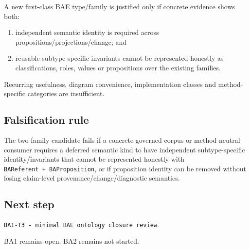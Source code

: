 \documentclass[
  10pt,
]{article}
\providecommand{\tightlist}{%
  \setlength{\itemsep}{0pt}\setlength{\parskip}{0pt}}
\begin{document}
A new first-class BAE type/family is justified only if concrete evidence
shows both:

\begin{enumerate}
\def\labelenumi{\arabic{enumi}.}
\tightlist
\item
  independent semantic identity is required across
  propositions/projections/change; and
\item
  reusable subtype-specific invariants cannot be represented honestly as
  classifications, roles, values or propositions over the existing
  families.
\end{enumerate}

Recurring usefulness, diagram convenience, implementation classes and
method-specific categories are insufficient.

\subsection{Falsification rule}\label{falsification-rule}

The two-family candidate fails if a concrete governed corpus or
method-neutral consumer requires a deferred semantic kind to have
independent subtype-specific identity/invariants that cannot be
represented honestly with \texttt{BAReferent\ +\ BAProposition}, or if
proposition identity can be removed without losing claim-level
provenance/change/diagnostic semantics.

\subsection{Next step}\label{next-step}

\texttt{BA1-T3\ -\ minimal\ BAE\ ontology\ closure\ review}.

BA1 remains open. BA2 remains not started.
\end{document}
